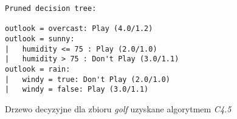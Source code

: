 \begin{figure}
\begin{verbatim}
Pruned decision tree:

outlook = overcast: Play (4.0/1.2)
outlook = sunny:
|   humidity <= 75 : Play (2.0/1.0)
|   humidity > 75 : Don't Play (3.0/1.1)
outlook = rain:
|   windy = true: Don't Play (2.0/1.0)
|   windy = false: Play (3.0/1.1)
\end{verbatim}
\caption{Drzewo decyzyjne dla zbioru \emph{golf} uzyskane algorytmem \emph{C4.5}}
\label{p2t1-tree}
\end{figure}
